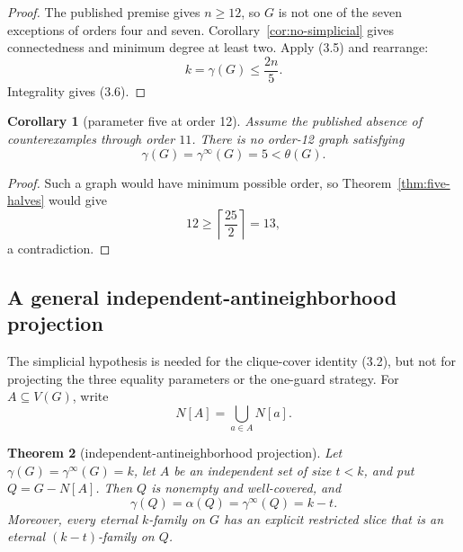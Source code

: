 \documentclass[11pt]{article}
\newtheorem{theorem}{Theorem}[section]
\newtheorem{corollary}[theorem]{Corollary}
\theoremstyle{definition}
\theoremstyle{remark}
\newcommand{\gaminf}{\gamma^{\infty}}
\newcommand{\V}{V}
\begin{document}
\begin{proof}
The published premise gives \(n\geq12\), so \(G\) is not one of the seven
exceptions of orders four and seven.  Corollary~\ref{cor:no-simplicial}
gives connectedness and minimum degree at least two.  Apply (3.5) and
rearrange:
\[
  k=\gamma(G)\leq\frac{2n}{5}.
\]
Integrality gives (3.6).
\end{proof}

\begin{corollary}[parameter five at order 12]\label{cor:k5}
Assume the published absence of counterexamples through order \(11\).
There is no order-12 graph satisfying
\[
  \gamma(G)=\gaminf(G)=5<\theta(G).
\]
\end{corollary}

\begin{proof}
Such a graph would have minimum possible order, so
Theorem~\ref{thm:five-halves} would give
\[
  12\geq\left\lceil\frac{25}{2}\right\rceil=13,
\]
a contradiction.
\end{proof}

\subsection{A general independent-antineighborhood projection}

The simplicial hypothesis is needed for the clique-cover identity (3.2),
but not for projecting the three equality parameters or the one-guard
strategy.  For \(A\subseteq\V(G)\), write
\[
  N[A]=\bigcup_{a\in A}N[a].
\]

\begin{theorem}[independent-antineighborhood projection]
\label{thm:antineighborhood}
Let \(\gamma(G)=\gaminf(G)=k\), let \(A\) be an independent set of size
\(t<k\), and put \(Q=G-N[A]\).  Then \(Q\) is nonempty and well-covered,
and
\[
  \gamma(Q)=\alpha(Q)=\gaminf(Q)=k-t.
\tag{3.7}
\]
Moreover, every eternal \(k\)-family on \(G\) has an explicit restricted
slice that is an eternal \((k-t)\)-family on \(Q\).
\end{theorem}
\end{document}
